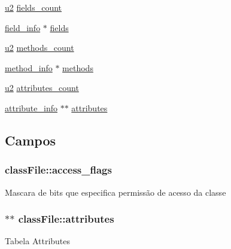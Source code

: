 \begin{DoxyCompactItemize}
\item 
\hyperlink{lista__operandos_8h_a732cde1300aafb73b0ea6c2558a7a54f}{u2} \hyperlink{structclassFile_aab140aacadd635ec42e6117d90f7363a}{fields\+\_\+count}
\item 
\hyperlink{structfield__info}{field\+\_\+info} $\ast$ \hyperlink{structclassFile_af08165230270046ef4f4dcc6fb8133ae}{fields}
\item 
\hyperlink{lista__operandos_8h_a732cde1300aafb73b0ea6c2558a7a54f}{u2} \hyperlink{structclassFile_a8c3eb4279e03c8b8f6525b6dd0ff6126}{methods\+\_\+count}
\item 
\hyperlink{structmethod__info}{method\+\_\+info} $\ast$ \hyperlink{structclassFile_a5417beaa23b6e9d5329dbee87a1f5238}{methods}
\item 
\hyperlink{lista__operandos_8h_a732cde1300aafb73b0ea6c2558a7a54f}{u2} \hyperlink{structclassFile_a9c2f1bdfe0c43e7189f2a7100bec1966}{attributes\+\_\+count}
\item 
\hyperlink{structattribute__info}{attribute\+\_\+info} $\ast$$\ast$ \hyperlink{structclassFile_a49c7b5a9f1718d9a883d3db7eb650757}{attributes}
\end{DoxyCompactItemize}


\subsection{Campos}
\subsubsection[{\texorpdfstring{access\+\_\+flags}{access_flags}}]{ class\+File\+::access\+\_\+flags}\hypertarget{structclassFile_a78e101546396d4b3d24d89b084b4eadf}{}\label{structclassFile_a78e101546396d4b3d24d89b084b4eadf}
Mascara de bits que especifica permissão de acesso da classe 
\subsubsection[{\texorpdfstring{attributes}{attributes}}]{$\ast$$\ast$ class\+File\+::attributes}\hypertarget{structclassFile_a49c7b5a9f1718d9a883d3db7eb650757}{}\label{structclassFile_a49c7b5a9f1718d9a883d3db7eb650757}
Tabela Attributes 
